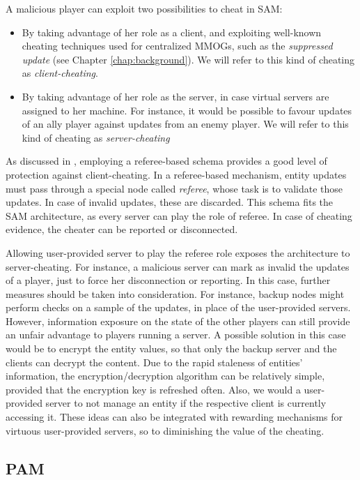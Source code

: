 \documentclass[final,10pt,a5paper]{phdimt}
\theoremstyle{definition}
\begin{document}
A malicious player can exploit two possibilities to cheat in SAM:
\begin{itemize}
\item By taking advantage of her role as a client, and exploiting well-known cheating techniques used for centralized MMOGs, such as the \textit{suppressed update} (see Chapter \ref{chap:background}). We will refer to this kind of cheating as \textit{client-cheating}.

\item By taking advantage of her role as the server, in case virtual servers are assigned to her machine. 
For instance, it would be possible to favour updates of an ally player against updates from an enemy player.
We will refer to this kind of cheating as \textit{server-cheating}
\end{itemize}

As discussed in \cite{Webb}, employing a referee-based schema provides a good level of protection against client-cheating.
In a referee-based mechanism, entity updates must pass through a special node called \textit{referee}, whose task is to validate those updates.
In case of invalid updates, these are discarded. 
This schema fits the SAM architecture, as every server can play the role of referee.
In case of cheating evidence, the cheater can be reported or disconnected.


Allowing user-provided server to play the referee role exposes the architecture to server-cheating. 
For instance, a malicious server can mark as invalid the updates of a player, just to force her disconnection or reporting.
In this case, further measures should be taken into consideration.
For instance, backup nodes might perform checks on a sample of the updates, in place of the user-provided servers.
However, information exposure on the state of the other players can still provide an unfair advantage to players running a server.
A possible solution in this case would be to encrypt the entity values, so that only the backup server and the clients can decrypt the content. 
Due to the rapid staleness of entities' information, the encryption/decryption algorithm can be relatively simple, provided that the encryption key is refreshed often.
Also, we would a user-provided server to not manage an entity if the respective client is currently accessing it.
These ideas can also be integrated with rewarding mechanisms for virtuous user-provided servers, so to diminishing the value of the cheating.



\subsection{PAM}
\end{document}
